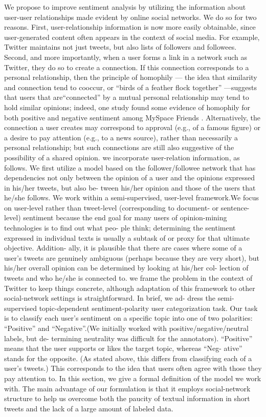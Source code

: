 \documentclass[runningheads,a4paper]{llncs}
\begin{document}
We propose to improve sentiment analysis by utilizing the information about user-user relationships made evident by online social networks. We do so for two reasons. First, user-relationship information is now more easily obtainable, since user-generated content often appears in the context of social media. For example, Twitter maintains not just tweets, but also lists of followers and followees. Second, and more importantly, when a user forms a link in a network such as Twitter, they do so to create a connection. If this connection corresponds to a personal relationship, then the principle of homophily \cite{lazarsfeld_friendship_1954} — the idea that similarity and connection tend to cooccur, or ``birds of a feather flock together'' \cite{mcpherson2001birds} —suggests that users that are``connected'' by a mutual personal relationship may tend to hold similar opinions; indeed, one study found some evidence of homophily for both positive and negative sentiment among MySpace Friends \cite{thelwall2010emotion}. Alternatively, the connection a user creates may correspond to approval (e.g., of a famous figure) or a desire to pay attention (e.g., to a news source), rather than necessarily a personal relationship; but such connections are still also suggestive of the possibility of a shared opinion.
we incorporate user-relation information, as follows. We first utilize a model based on the follower/followee network that has dependencies not only between the opinion of a user and the opinions expressed in his/her tweets, but also be- tween his/her opinion and those of the users that he/she follows.
We work within a semi-supervised, user-level framework.We focus on user-level rather than tweet-level (corresponding to document- or sentence-level) sentiment because the end goal for many users of opinion-mining technologies is to find out what peo- ple think; determining the sentiment expressed in individual texts is usually a subtask of or proxy for that ultimate objective. Addition- ally, it is plausible that there are cases where some of a user’s tweets are genuinely ambiguous (perhaps because they are very short), but his/her overall opinion can be determined by looking at his/her col- lection of tweets and who he/she is connected to.\cite{tan2011user}
we frame the problem in the context of Twitter to keep things concrete, although adaptation of this framework to other social-network settings is straightforward. In brief, we ad- dress the semi-supervised topic-dependent sentiment-polarity user categorization task.
Our task is to classify each user’s sentiment on a specific topic
into one of two polarities: “Positive” and “Negative”.(We initially worked with positive/negative/neutral labels, but de- termining neutrality was difficult for the annotators). “Positive” means that the user supports or likes the target topic, whereas “Neg- ative” stands for the opposite. (As stated above, this differs from classifying each of a user’s tweets.)
This corresponds to the idea that users often agree with those they pay attention to.
In this section, we give a formal definition of the model we work
with. 
The main advantage of our formulation is that it employs social-network structure to help us overcome both the paucity of textual information in short tweets and the lack of a large amount of labeled data.
\end{document}

